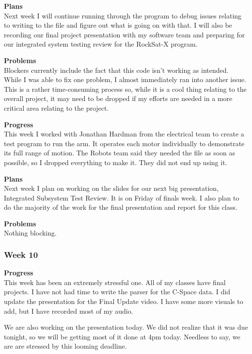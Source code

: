 \textbf{Plans} \\
Next week I will continue running through the program to debug issues relating to writing to the file and figure out what is going on with that. I will 
also be recording our final project presentation with my software team and preparing for our integrated system testing review for the RockSat-X program.

\textbf{Problems} \\
Blockers currently include the fact that this code isn't working as intended. While I was able to fix one problem, I almost immediately ran into another 
issue. This is a rather time-consuming process so, while it is a cool thing relating to the overall project, it may need to be dropped if my efforts are 
needed in a more critical area relating to the project.

\textbf{Progress} \\
This week I worked with Jonathan Hardman from the electrical team to create a 
test program to run the arm. It operates each motor individually to 
demonstrate its full range of motion. The Robots team said they needed the 
file as soon as possible, so I dropped everything to make it. They did not end
up using it.

\textbf{Plans} \\
Next week I plan on working on the slides for our next big presentation, 
Integrated Subsystem Test Review. It is on Friday of finals week. I also plan 
to do the majority of the work for the final presentation and report for this 
class.

\textbf{Problems} \\
Nothing blocking.

\subsubsection{Week 10}
\textbf{Progress} \\ 
This week has been an extremely stressful one. All of my classes have final projects. I have not had time to write the parser for the C-Space data. I did update the presentation for the Final Update video. I have some more visuals to add, but I have recorded most of my audio.

We are also working on the presentation today. We did not realize that it was due tonight, so we will be getting most of it done at 4pm today. Needless to say, we are are stressed by this looming deadline.

